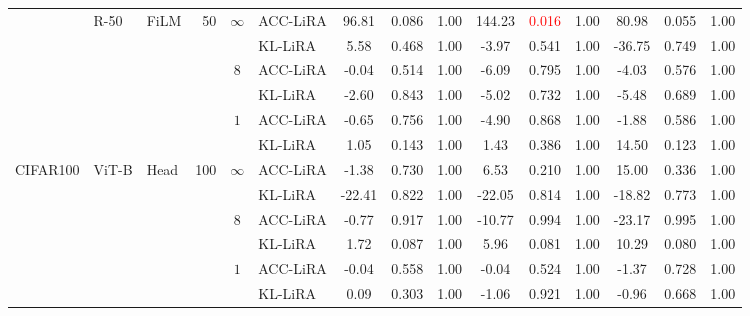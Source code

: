 \begin{table*}[htb]
\begin{center}
{\begin{tabular}{lllrclccccccccc}
\cmidrule{2-15}
 &  \multirow{6}{*}{R-50}  & \multirow{6}{*}{FiLM} & \multirow{6}{*}{50} & \multirow{2}{*}{$\infty$} & ACC-LiRA & 96.81 & 0.086 & 1.00& 144.23 & \textcolor{red}{0.016} & 1.00& 80.98 & 0.055 & 1.00\\
 &  &  &  & & KL-LiRA & 5.58 & 0.468 & 1.00 & -3.97 & 0.541 & 1.00 & -36.75 & 0.749 & 1.00 \\
\cmidrule{5-15}
 &  &  &  & \multirow{2}{*}{$8$} & ACC-LiRA & -0.04 & 0.514 & 1.00 & -6.09 & 0.795 & 1.00 & -4.03 & 0.576 & 1.00 \\
 &  &  &  &  & KL-LiRA & -2.60 & 0.843 & 1.00 & -5.02 & 0.732 & 1.00 & -5.48 & 0.689 & 1.00 \\
\cmidrule{5-15}
 &  &  &  & \multirow{2}{*}{$1$} & ACC-LiRA & -0.65 & 0.756 & 1.00 & -4.90 & 0.868 & 1.00 & -1.88 & 0.586 & 1.00 \\
 &  &  &  &  & KL-LiRA & 1.05 & 0.143 & 1.00& 1.43 & 0.386 & 1.00 & 14.50 & 0.123 & 1.00\\
\cmidrule{1-15}
\multirow{6}{*}{CIFAR100} & \multirow{6}{*}{ViT-B} & \multirow{6}{*}{Head} & \multirow{6}{*}{100} &\multirow{2}{*}{$\infty$}& ACC-LiRA & -1.38 & 0.730 & 1.00 & 6.53 & 0.210 & 1.00& 15.00 & 0.336 & 1.00 \\
 &  &  &  & & KL-LiRA & -22.41 & 0.822 & 1.00 & -22.05 & 0.814 & 1.00 & -18.82 & 0.773 & 1.00 \\
\cmidrule{5-15}
 &  &  &  & \multirow{2}{*}{$8$} & ACC-LiRA & -0.77 & 0.917 & 1.00 & -10.77 & 0.994 & 1.00 & -23.17 & 0.995 & 1.00 \\
 &  &  &  &  & KL-LiRA & 1.72 & 0.087 & 1.00& 5.96 & 0.081 & 1.00& 10.29 & 0.080 & 1.00\\
\cmidrule{5-15}
 &  &  &  & \multirow{2}{*}{$1$} & ACC-LiRA & -0.04 & 0.558 & 1.00 & -0.04 & 0.524 & 1.00 & -1.37 & 0.728 & 1.00 \\
 &  &  &  &  & KL-LiRA & 0.09 & 0.303 & 1.00 & -1.06 & 0.921 & 1.00 & -0.96 & 0.668 & 1.00 \\
\bottomrule
\end{tabular}}
\end{center}
\end{table*}
